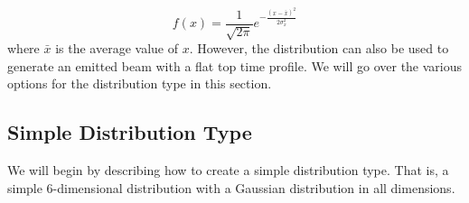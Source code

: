 \begin{equation*}
  f(x) = \frac{1}{\sqrt{2 \pi}} e^{-\frac{(x - \bar{x})^{2}}{2 \sigma_{x}^{2}}}
\end{equation*}
where $\bar{x}$ is the average value of $x$. However, the  distribution can also be used to
generate an emitted beam with a flat top time profile. We will go over the various options for the 
distribution type in this section.

\subsection{Simple  Distribution Type}
We will begin by describing how to create a simple  distribution type. That is, a simple
6-dimensional distribution with a Gaussian distribution in all dimensions.

